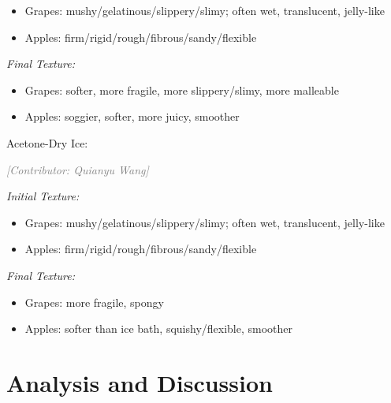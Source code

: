 \documentclass[12pt, a4paper]{article}
\newcommand{\contributor}[1]{\vspace{4pt}\noindent\textcolor{gray}{\small\textit{[Contributor: #1]}}\vspace{2pt}}
\begin{document}
\begin{itemize}
\item Grapes: mushy/gelatinous/slippery/slimy; often wet, translucent, jelly-like
\item Apples: firm/rigid/rough/fibrous/sandy/flexible
\end{itemize}

\textit{Final Texture:}

\begin{itemize}
\item Grapes: softer, more fragile, more slippery/slimy, more malleable
\item Apples: soggier, softer, more juicy, smoother
\end{itemize}

Acetone-Dry Ice:

\contributor{Quianyu Wang}

\textit{Initial Texture:}

\begin{itemize}
\item Grapes: mushy/gelatinous/slippery/slimy; often wet, translucent, jelly-like
\item Apples: firm/rigid/rough/fibrous/sandy/flexible
\end{itemize}

\textit{Final Texture:}

\begin{itemize}
\item Grapes: more fragile, spongy
\item Apples: softer than ice bath, squishy/flexible, smoother
\end{itemize}

\section{Analysis and Discussion}

\end{document}
